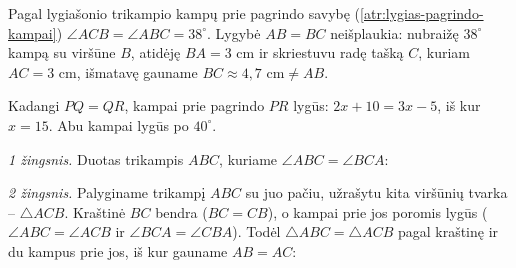 \documentclass[12pt,a4paper,reqno]{amsart}
\newcommand{\krastineszymek}[1]{\tikz[baseline=(current bounding box.center)]{\foreach \x in {#1}{\draw (\x pt,-2.5pt)--(\x pt,2.5pt);}}}
\theoremstyle{plain}\newtheorem{theorem}{Teorema}[section]
\theoremstyle{definition}
\theoremstyle{remark}\newtheorem{remark}[theorem]{Pastaba}\newtheorem*{remark*}{Pastaba}
\theoremstyle{definition}\newtheorem*{problem*}{Uždavinys}
\begin{document}
\begin{solution}[\ref{uzd:lygias-kampai-01}]
Pagal lygiašonio trikampio kampų prie pagrindo savybę (\ref{atr:lygias-pagrindo-kampai}) $\angle ACB=\angle ABC=38^\circ$. Lygybė $AB=BC$ neišplaukia: nubraižę $38^\circ$ kampą su viršūne $B$, atidėję $BA=3$ cm ir skriestuvu radę tašką $C$, kuriam $AC=3$ cm, išmatavę gauname $BC\approx 4{,}7\text{ cm}\ne AB$.
\end{solution}

\begin{solution}[\ref{uzd:lygias-kampai-02}]
Kadangi $PQ=QR$, kampai prie pagrindo $PR$ lygūs: $2x+10=3x-5$, iš kur $x=15$. Abu kampai lygūs po $40^\circ$.
\end{solution}

\begin{solution}[\ref{atr:lygias-atvirkstine}]
\par\emph{1 žingsnis.} Duotas trikampis $ABC$, kuriame $\angle ABC=\angle BCA$:
\begin{center}
\end{center}
\par\emph{2 žingsnis.} Palyginame trikampį $ABC$ su juo pačiu, užrašytu kita viršūnių tvarka – $\triangle ACB$. Kraštinė $BC$ bendra ($BC=CB$), o kampai prie jos poromis lygūs ($\angle ABC=\angle ACB$ ir $\angle BCA=\angle CBA$). Todėl $\triangle ABC=\triangle ACB$ pagal kraštinę ir du kampus prie jos, iš kur gauname $AB=AC$:
\begin{center}
\end{center}
\end{solution}
\end{document}
